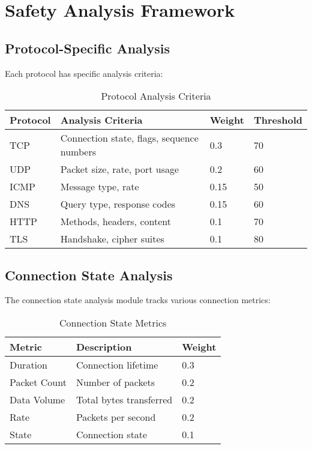 \documentclass[conference]{IEEEtran}
\begin{document}
\section{Safety Analysis Framework}
\label{sec:safety}

\subsection{Protocol-Specific Analysis}
Each protocol has specific analysis criteria:

\begin{table}[H]
\centering
\caption{Protocol Analysis Criteria}
\begin{tabular}{llll}
\toprule
Protocol & Analysis Criteria & Weight & Threshold \\
\midrule
TCP & Connection state, flags, sequence numbers & 0.3 & 70 \\
UDP & Packet size, rate, port usage & 0.2 & 60 \\
ICMP & Message type, rate & 0.15 & 50 \\
DNS & Query type, response codes & 0.15 & 60 \\
HTTP & Methods, headers, content & 0.1 & 70 \\
TLS & Handshake, cipher suites & 0.1 & 80 \\
\bottomrule
\end{tabular}
\label{tab:protocol_criteria}
\end{table}

\subsection{Connection State Analysis}
The connection state analysis module tracks various connection metrics:

\begin{table}[H]
\centering
\caption{Connection State Metrics}
\begin{tabular}{lll}
\toprule
Metric & Description & Weight \\
\midrule
Duration & Connection lifetime & 0.3 \\
Packet Count & Number of packets & 0.2 \\
Data Volume & Total bytes transferred & 0.2 \\
Rate & Packets per second & 0.2 \\
State & Connection state & 0.1 \\
\bottomrule
\end{tabular}
\label{tab:connection_metrics}
\end{table}
\end{document}
